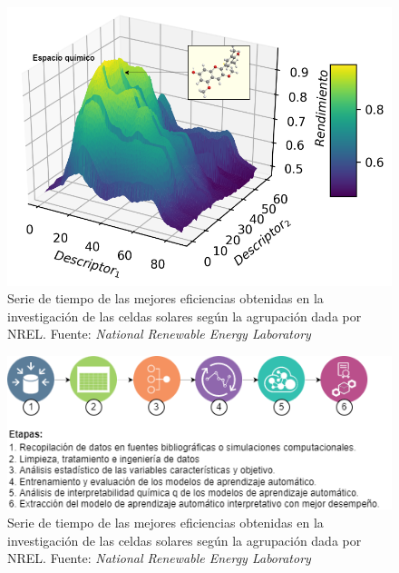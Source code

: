 \begin{figure}[h!]
    \begin{center}
        \includegraphics[scale=0.45]{img/espacioquimico.png}
    \end{center}
    \label{img:espacioquimico}
    \caption{Serie de tiempo de las mejores eficiencias obtenidas en la investigación de las celdas solares según la agrupación dada por NREL.
    Fuente: \textit{National Renewable Energy Laboratory} \cite{owidenergy}}
\end{figure}

\begin{figure}[h!]
    \begin{center}
        \includegraphics[scale=0.7]{img/etapas.png}
    \end{center}
    \label{img:etapas}
    \caption{Serie de tiempo de las mejores eficiencias obtenidas en la investigación de las celdas solares según la agrupación dada por NREL.
    Fuente: \textit{National Renewable Energy Laboratory} \cite{owidenergy}}
\end{figure}
